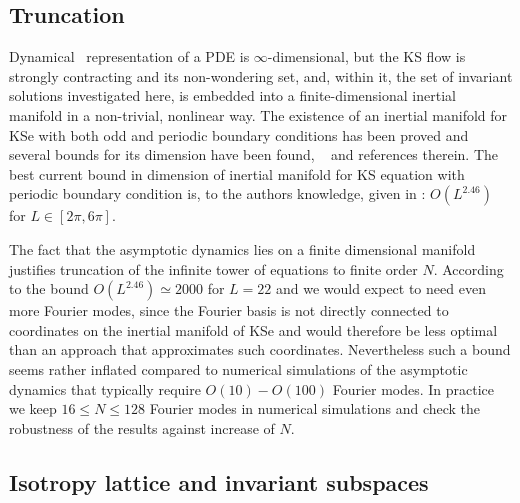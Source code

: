 \subsection{Truncation}

Dynamical \statesp\ representation of a PDE is $\infty$-dimensional,
but the KS flow is strongly contracting and its non-wondering set,
and, within it, the set of invariant solutions investigated here, is
embedded into a finite-dimensional inertial manifold in
a non-trivial, nonlinear way. The existence of an inertial manifold for
KSe with both odd and periodic boundary conditions has been proved and
several bounds for its dimension have been found, \cf\  and references
therein. The best current bound in dimension of inertial manifold for KS
equation with periodic boundary condition is, to the authors knowledge,
given in : $O(L^{2.46})$ for $L\in[2\pi,6\pi]$.

The fact that the asymptotic dynamics lies on a finite dimensional manifold
justifies truncation of the infinite tower of equations  to finite
order $N$. According to the bound $O(L^{2.46})\simeq2000$ for $L=22$ and 
we would expect to need even more Fourier modes, since the Fourier basis
is not directly connected to coordinates on the inertial manifold of KSe and would therefore
be less optimal than an approach that approximates such coordinates\cite[for example]{Jolly_approximate_1990,jolly_accurate_2001}.
Nevertheless such a bound seems rather inflated compared to numerical simulations
of the asymptotic dynamics that typically require $O(10)-O(100)$ Fourier modes. 
In practice we keep $16\leq N \leq 128$ Fourier modes in numerical simulations 
and check the robustness of the results against increase of $N$.

\subsection{Isotropy lattice and invariant subspaces}
\label{ksIso}

